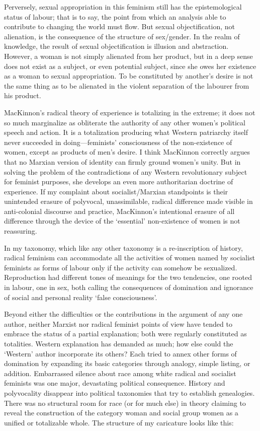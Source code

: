 \documentclass[DIV=12,%
               BCOR=10mm,%
               headinclude=false,%
               footinclude=false,open=any,%
               fontsize=11pt,%
               twoside,%
               paper=210mm:11in]%
               {scrbook}
\newcommand*{\Slash}{\slash\hspace{0pt}}
\begin{document}
Perversely, sexual appropriation in this feminism still has the epistemological status of labour; that is to say, the point from which an analysis able to contribute to changing the world must flow. But sexual objectification, not alienation, is the consequence of the structure of sex\Slash{}gender. In the realm of knowledge, the result of sexual objectification is illusion and abstraction. However, a woman is not simply alienated from her product, but in a deep sense does not exist as a subject, or even potential subject, since she owes her existence as a woman to sexual appropriation. To be constituted by another’s desire is not the same thing as to be alienated in the violent separation of the labourer from his product.


MacKinnon’s radical theory of experience is totalizing in the extreme; it does not so much marginalize as obliterate the authority of any other women’s political speech and action. It is a totalization producing what Western patriarchy itself never succeeded in doing—feminists’ consciousness of the non-existence of women, except as products of men’s desire. I think MacKinnon correctly argues that no Marxian version of identity can firmly ground women’s unity. But in solving the problem of the contradictions of any Western revolutionary subject for feminist purposes, she develops an even more authoritarian doctrine of experience. If my complaint about socialist\Slash{}Marxian standpoints is their unintended erasure of polyvocal, unassimilable, radical difference made visible in anti-colonial discourse and practice, MacKinnon’s intentional erasure of all difference through the device of the ‘essential’ non-existence of women is not reassuring.


In my taxonomy, which like any other taxonomy is a re-inscription of history, radical feminism can accommodate all the activities of women named by socialist feminists as forms of labour only if the activity can somehow be sexualized. Reproduction had different tones of meanings for the two tendencies, one rooted in labour, one in sex, both calling the consequences of domination and ignorance of social and personal reality ‘false consciousness’.


Beyond either the difficulties or the contributions in the argument of any one author, neither Marxist nor radical feminist points of view have tended to embrace the status of a partial explanation; both were regularly constituted as totalities. Western explanation has demanded as much; how else could the ‘Western’ author incorporate its others? Each tried to annex other forms of domination by expanding its basic categories through analogy, simple listing, or addition. Embarrassed silence about race among white radical and socialist feminists was one major, devastating political consequence. History and polyvocality disappear into political taxonomies that try to establish genealogies. There was no structural room for race (or for much else) in theory claiming to reveal the construction of the category woman and social group women as a unified or totalizable whole. The structure of my caricature looks like this:
\end{document}
